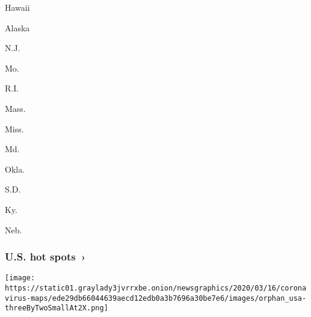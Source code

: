 Hawaii

\href{https://www.nytimes3xbfgragh.onion/interactive/2020/us/alaska-coronavirus-cases.html}{}

Alaska

\href{https://www.nytimes3xbfgragh.onion/interactive/2020/us/new-jersey-coronavirus-cases.html}{}

N.J.

\href{https://www.nytimes3xbfgragh.onion/interactive/2020/us/missouri-coronavirus-cases.html}{}

Mo.

\href{https://www.nytimes3xbfgragh.onion/interactive/2020/us/rhode-island-coronavirus-cases.html}{}

R.I.

\href{https://www.nytimes3xbfgragh.onion/interactive/2020/us/massachusetts-coronavirus-cases.html}{}

Mass.

\href{https://www.nytimes3xbfgragh.onion/interactive/2020/us/mississippi-coronavirus-cases.html}{}

Miss.

\href{https://www.nytimes3xbfgragh.onion/interactive/2020/us/maryland-coronavirus-cases.html}{}

Md.

\href{https://www.nytimes3xbfgragh.onion/interactive/2020/us/oklahoma-coronavirus-cases.html}{}

Okla.

\href{https://www.nytimes3xbfgragh.onion/interactive/2020/us/south-dakota-coronavirus-cases.html}{}

S.D.

\href{https://www.nytimes3xbfgragh.onion/interactive/2020/us/kentucky-coronavirus-cases.html}{}

Ky.

\href{https://www.nytimes3xbfgragh.onion/interactive/2020/us/nebraska-coronavirus-cases.html}{}

Neb.

\href{https://www.nytimes3xbfgragh.onion/interactive/2020/us/coronavirus-us-cases.html}{}

\hypertarget{us-hot-spots-}{%
\subsubsection{U.S. hot spots~›}\label{us-hot-spots-}}

\texttt{[image: https://static01.graylady3jvrrxbe.onion/newsgraphics/2020/03/16/coronavirus-maps/ede29db66044639aecd12edb0a3b7696a30be7e6/images/orphan\_usa-threeByTwoSmallAt2X.png]}

